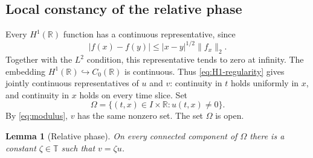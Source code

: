 \documentclass[11pt]{amsart}
\newtheorem{lemma}[theorem]{Lemma}
\numberwithin{equation}{section}
\theoremstyle{remark}
\newcommand{\R}{\mathbb R}
\newcommand{\T}{\mathbb T}
\begin{document}
\subsection{Local constancy of the relative phase}

Every $H^1(\R)$ function has a continuous representative, since
\[
 |f(x)-f(y)|\le |x-y|^{1/2}\|f_x\|_2.
\]
Together with the $L^2$ condition, this representative tends to zero at
infinity.  The embedding $H^1(\R)\hookrightarrow C_0(\R)$ is continuous.
Thus \eqref{eq:H1-regularity} gives jointly continuous representatives of
$u$ and $v$: continuity in $t$ holds uniformly in $x$, and continuity in $x$
holds on every time slice.  Set
\[
 \Omega=\{(t,x)\in I\times\R:u(t,x)\ne0\}.
\]
By \eqref{eq:modulus}, $v$ has the same nonzero set.  The set $\Omega$ is
open.

\begin{lemma}[Relative phase]
\label{lem:relative-phase}
On every connected component of $\Omega$ there is a constant $\zeta\in\T$
such that $v=\zeta u$.
\end{lemma}
\end{document}
